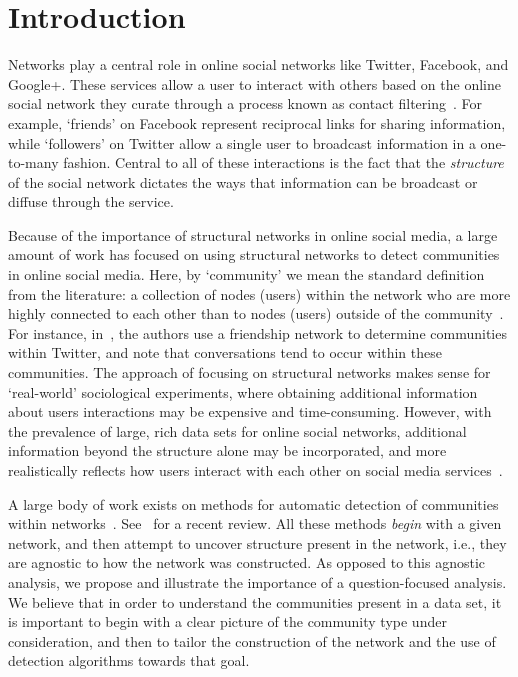 \section{Introduction}

Networks play a central role in online social networks like Twitter, Facebook, and Google+. These services allow a user to interact with others based on the online social network they curate through a process known as contact filtering~\cite{cazabet2012automated}. For example, `friends' on Facebook represent reciprocal links for sharing information, while `followers' on Twitter allow a single user to broadcast information in a one-to-many fashion. Central to all of these interactions is the fact that the \emph{structure} of the social network dictates the ways that information can be broadcast or diffuse through the service.

Because of the importance of structural networks in online social media, a large amount of work has focused on using structural networks to detect communities in online social media. Here, by `community' we mean the standard definition from the literature: a collection of nodes (users) within the network who are more highly connected to each other than to nodes (users) outside of the community~\cite{newman2004finding}. For instance, in~\cite{java2009we}, the authors use a friendship network to determine communities within Twitter, and note that conversations tend to occur within these communities. The approach of focusing on structural networks makes sense for `real-world' sociological experiments, where obtaining additional information about users interactions may be expensive and time-consuming. However, with the prevalence of large, rich data sets for online social networks, additional information beyond the structure alone may be incorporated, and more realistically reflects how users interact with each other on social media services~\cite{grabowicz2012social}.

A large body of work exists on methods for automatic detection of communities within networks~\cite{newman2004fast,newman2004finding,rosvall2008maps,blondel2008fast,LancichinettiPlos}. See~\cite{fortunato2010community} for a recent review. All these methods \emph{begin} with a given network, and then attempt to uncover structure present in the network, i.e., they are agnostic to how the network was constructed. As opposed to this agnostic analysis, we propose and illustrate the importance of a question-focused analysis. We believe that in order to understand the communities present in a data set, it is important to begin with a clear picture of the community type under consideration, and then to tailor the construction of the network and the use of detection algorithms towards that goal.

